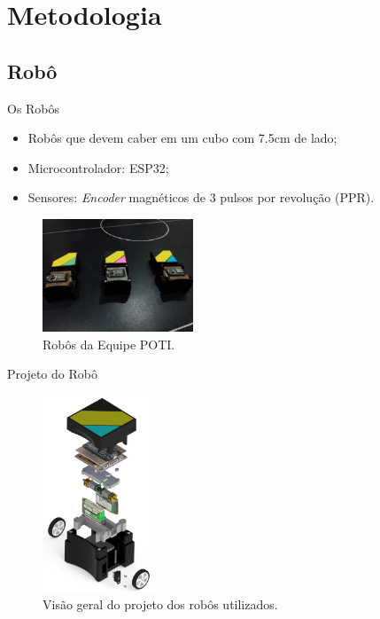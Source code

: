 \section{Metodologia}
\subsection{Robô}

\begin{frame}{Os Robôs}

\begin{itemize}
    \item Robôs que devem caber em um cubo com 7.5cm de lado;
    \item Microcontrolador: ESP32;
    \item Sensores: \emph{Encoder} magnéticos de $3$ pulsos por revolução (PPR).
\end{itemize}
    
    \begin{figure}
        \centering
        \includegraphics[width=0.4\textwidth]{figuras/robos/robos_capa_aberta.jpg}
        \caption{Robôs da Equipe POTI.}
    \end{figure}
\end{frame}


\begin{frame}{Projeto do Robô}
    \begin{figure}
        \centering
        \includegraphics[width=0.3\textwidth]{figuras/robos/robo_completo_explodido.png}
        \caption{Visão geral do projeto dos robôs utilizados.}
    \end{figure}
\end{frame}

